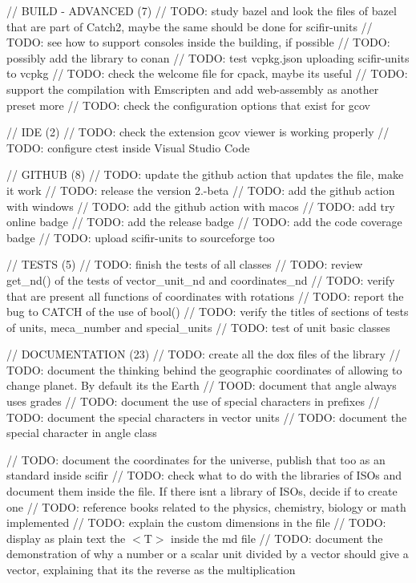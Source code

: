 // BUILD -\/ ADVANCED (7) // TODO\+: study bazel and look the files of bazel that are part of Catch2, maybe the same should be done for scifir-\/units // TODO\+: see how to support consoles inside the building, if possible // TODO\+: possibly add the library to conan // TODO\+: test vcpkg.\+json uploading scifir-\/units to vcpkg // TODO\+: check the welcome file for cpack, maybe it\textquotesingle{}s useful // TODO\+: support the compilation with Emscripten and add web-\/assembly as another preset more // TODO\+: check the configuration options that exist for gcov

// IDE (2) // TODO\+: check the extension gcov viewer is working properly // TODO\+: configure ctest inside Visual Studio Code

// GITHUB (8) // TODO\+: update the github action that updates the  file, make it work // TODO\+: release the version 2.-\/beta // TODO\+: add the github action with windows // TODO\+: add the github action with macos // TODO\+: add try online badge // TODO\+: add the release badge // TODO\+: add the code coverage badge // TODO\+: upload scifir-\/units to sourceforge too

// TESTS (5) // TODO\+: finish the tests of all classes // TODO\+: review get\+\_\+nd() of the tests of vector\+\_\+unit\+\_\+nd and coordinates\+\_\+nd // TODO\+: verify that are present all functions of coordinates with rotations // TODO\+: report the bug to CATCH of the use of bool() // TODO\+: verify the titles of sections of tests of units, meca\+\_\+number and special\+\_\+units // TODO\+: test of unit basic classes

// DOCUMENTATION (23) // TODO\+: create all the dox files of the library // TODO\+: document the thinking behind the geographic coordinates of allowing to change planet. By default it\textquotesingle{}s the Earth // TOOD\+: document that angle always uses grades // TODO\+: document the use of special characters in prefixes // TODO\+: document the special characters in vector units // TODO\+: document the special character in angle class

// TODO\+: document the coordinates for the universe, publish that too as an standard inside scifir // TODO\+: check what to do with the libraries of ISOs and document them inside the  file. If there isn\textquotesingle{}t a library of ISOs, decide if to create one // TODO\+: reference books related to the physics, chemistry, biology or math implemented // TODO\+: explain the custom dimensions in the file  // TODO\+: display as plain text the $<$\+T$>$ inside the md file // TODO\+: document the demonstration of why a number or a scalar unit divided by a vector should give a vector, explaining that it\textquotesingle{}s the reverse as the multiplication

